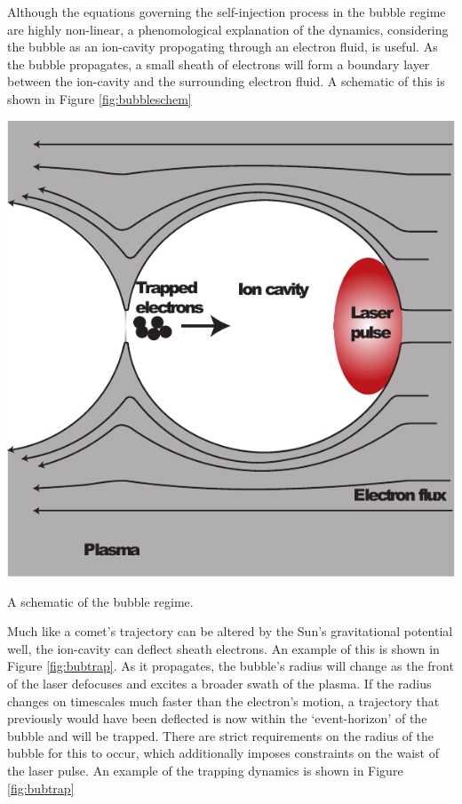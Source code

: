 \documentclass[12pt,letter]{article}
\begin{document}
Although the equations governing the self-injection process in the bubble
regime are highly non-linear, a phenomological explanation of the
dynamics, considering the bubble as an ion-cavity propogating through an
electron fluid, is useful. As the bubble propagates, a small sheath of electrons will form a boundary layer
between the ion-cavity and the surrounding electron fluid. A schematic of this
is shown in Figure \ref{fig:bubbleschem} 
    \begin{marginfigure}
    \includegraphics[width=\marginparwidth]{../figures/bubbleschem.pdf}
    \caption{A schematic of the bubble
    regime.\cite{genothesis}\label{fig:bubbleschem}}
\end{marginfigure}

Much like a comet's trajectory  can be
altered by the
Sun's gravitational potential well, the ion-cavity can deflect sheath electrons.
An example of this is shown in Figure \ref{fig:bubtrap}. As it propagates, the
bubble's radius will change as the front of the laser defocuses and excites a
broader swath of the plasma. If the radius changes on timescales much faster
than the electron's motion, a trajectory that previously would have been
deflected is now within the
`event-horizon' of the bubble and will be trapped. There are strict requirements on the radius of the bubble for this to occur,
    which additionally imposes constraints on the waist of the
    laser pulse\cite{PhysRevLett.103.175003}. An example of the
    trapping dynamics is shown in Figure \ref{fig:bubtrap}
\end{document}
